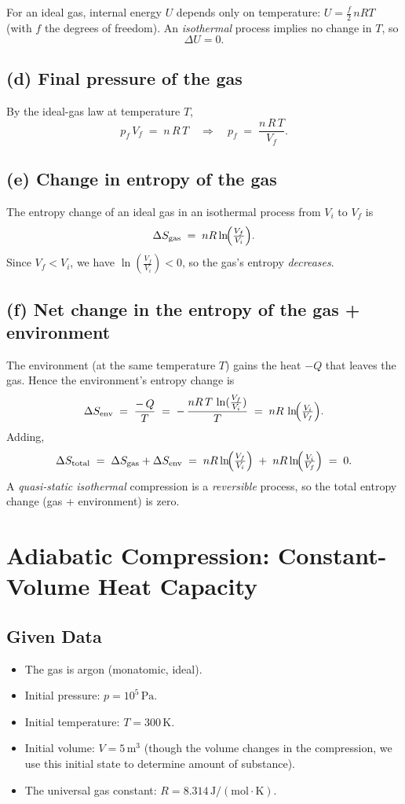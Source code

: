 \documentclass[12pt]{article}
\theoremstyle{definition} %
\theoremstyle{plain} %
\begin{document}
For an ideal gas, internal energy $U$ depends only on temperature: $U=\tfrac{f}{2}\,nRT$ (with $f$ the degrees of freedom). An \emph{isothermal} process implies no change in $T$, so
\[
\Delta U = 0.
\]

\subsection*{(d) Final pressure of the gas}

By the ideal-gas law at temperature $T$,
\[
p_f\,V_f 
\;=\; 
n\,R\,T
\quad\Longrightarrow\quad
p_f 
\;=\;
\frac{n\,R\,T}{V_f}.
\]

\subsection*{(e) Change in entropy of the gas}

The entropy change of an ideal gas in an isothermal process from $V_i$ to $V_f$ is
\[
\Delta S_{\text{gas}}
\;=\;
nR\ln\!\Bigl(\tfrac{V_f}{V_i}\Bigr).
\]
Since $V_f < V_i$, we have $\ln(\tfrac{V_f}{V_i})<0$, so the gas's entropy \emph{decreases}.

\subsection*{(f) Net change in the entropy of the gas + environment}

The environment (at the same temperature $T$) gains the heat $-Q$ that leaves the gas. Hence the environment's entropy change is
\[
\Delta S_{\text{env}}
\;=\;
\frac{-\,Q}{T}
\;=\;
-\,\frac{nR\,T \,\ln(\tfrac{V_f}{V_i})}{T}
\;=\;
nR\,\ln\!\Bigl(\tfrac{V_i}{V_f}\Bigr).
\]
Adding,
\[
\Delta S_{\text{total}}
\;=\;
\Delta S_{\text{gas}} + \Delta S_{\text{env}}
\;=\;
nR\ln\!\Bigl(\tfrac{V_f}{V_i}\Bigr)
\;+\;
nR\ln\!\Bigl(\tfrac{V_i}{V_f}\Bigr)
\;=\; 0.
\]
A \emph{quasi‐static isothermal} compression is a \emph{reversible} process, so the total entropy change (gas + environment) is zero.


\section*{Adiabatic Compression: Constant-Volume Heat Capacity}

\subsection*{Given Data}

\begin{itemize}
    \item The gas is argon (monatomic, ideal).
    \item Initial pressure: $p = 10^5 \,\mathrm{Pa}$.
    \item Initial temperature: $T = 300\,\mathrm{K}$.
    \item Initial volume: $V = 5\,\mathrm{m}^3$ (though the volume changes in the compression, 
          we use this initial state to determine amount of substance).
    \item The universal gas constant: $R = 8.314\,\mathrm{J/(mol\cdot K)}$.
\end{itemize}
\end{document}
